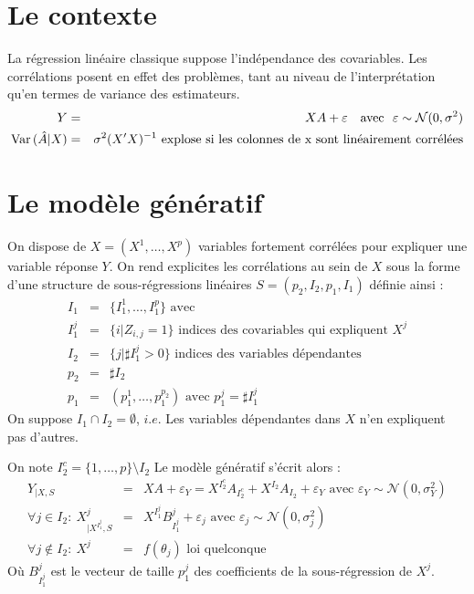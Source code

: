 \documentclass[12pt]{article}
\begin{document}

\section{Le contexte}
	La régression linéaire classique suppose l'indépendance des covariables. Les corrélations posent en effet des problèmes, tant au niveau de l'interprétation qu'en termes de variance des estimateurs.
	\begin{eqnarray}
		Y&=&XA+\varepsilon \ \ \textrm{ avec } \ \varepsilon\sim \mathcal{N}(0,\sigma^2) \\
		{\rm Var}\,(\hat{A}|X)&=& \sigma^2(X'X)^{-1} \textrm{ explose si les colonnes de x sont linéairement corrélées}
	\end{eqnarray}
			
	
	
\section{Le modèle génératif}
On dispose de $X=(X^1,\dots,X^p)$ variables fortement corrélées pour expliquer une variable réponse $Y$.
On rend explicites les corrélations au sein de $X$ sous la forme d'une structure de sous-régressions linéaires $S=(p_2,I_2,p_1,I_1)$ définie ainsi :
	\begin{eqnarray}
		I_1&=&\{I_1^1,\dots,I_1^{p}\} \textrm{ avec}		\\
		I_1^j &=& \{i |Z_{i,j}=1 \} \textrm{ indices des covariables qui expliquent $X^j$} \\
		I_2&=&\{j |\sharp I_1^j>0 \}  \textrm{ indices des variables dépendantes} \\
		p_2&=& \sharp I_2 \\
		p_1&=&(p_1^1,\dots,p_1^{p_2}) \textrm{ avec }p_1^j=\sharp I_1^j 
	\end{eqnarray}
	On suppose $I_1\cap I_2=\emptyset$, $i.e.$ Les variables dépendantes dans $X$ n'en expliquent pas d'autres. 
	
	On note $I_2^c=\{1,\dots,p\}\setminus I_2$
Le modèle génératif s'écrit alors :
\begin{eqnarray}
	Y_{|X,S}&=&XA+\varepsilon_Y= X^{I_2^c}A_{I_2^c}+X^{I_2}A_{I_2}+\varepsilon_Y \textrm{ avec } \varepsilon_Y \sim \mathcal{N}(0,\sigma_Y^2) \label{MainR}\\
	\forall j \in I_2 : \  X^j_{|X^{I_1^j},S}&=&X^{I_1^j}B_{I_1^j}^j + \varepsilon_{j} \textrm{ avec } \varepsilon_j \sim \mathcal{N}(0,\sigma_j^2) \label{SR}\\
    \forall j \notin I_2 : \ X^j &=& f(\theta_j) \textrm{ loi quelconque}	
\end{eqnarray}
Où $B_{I_1^j}^j$ est le vecteur de taille $p_1^j$ des coefficients de la sous-régression de $X^j$.
\end{document}
